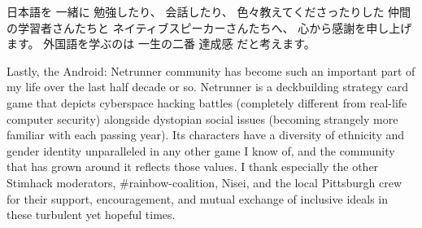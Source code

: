 \documentclass[12pt]{cmuthesis}
\begin{document}
\begin{acknowledgments}
{%
%
%
日本語を
一緒に
勉強したり、
会話したり、
色々教えてくださったりした
仲間の学習者さんたちと
ネイティブスピーカーさんたちへ、
心から感謝を申し上げます。
外国語を学ぶのは
一生の二番
達成感
だと考えます。

Lastly,
the Android: Netrunner community has become such an important part of my life
over the last half decade or so.
Netrunner is a deckbuilding strategy card game
that depicts cyberspace hacking battles (completely different from real-life computer security)
alongside dystopian social issues (becoming strangely more familiar with each passing year).
Its characters have a diversity of ethnicity and gender identity %
unparalleled in any other game I know of,
and the community that has grown around it reflects those values.
I thank especially the other Stimhack moderators,
{\sf \#rainbow-coalition},
Nisei,
and the local Pittsburgh crew
for their support, encouragement,
and mutual exchange of inclusive ideals in these turbulent yet hopeful times.
}

\end{acknowledgments}
\end{document}
